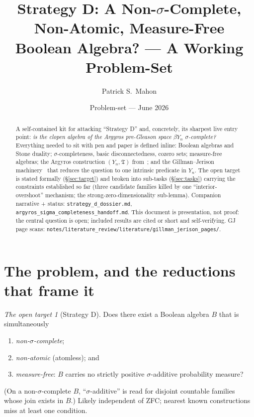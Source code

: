 \documentclass[11pt]{article}
\title{Strategy D: A Non-$\sigma$-Complete, Non-Atomic, Measure-Free\\
Boolean Algebra? --- A Working Problem-Set}
\author{Patrick S.\ Mahon}
\date{Problem-set --- June 2026}
\theoremstyle{definition}
\theoremstyle{remark}
\newtheorem*{target}{The open target}
\newcommand{\Y}{Y_n}
\newcommand{\T}{\mathfrak{T}}
\begin{document}
\maketitle

\begin{abstract}
\noindent A self-contained kit for attacking ``Strategy D'' and, concretely, its
sharpest live entry point: \emph{is the clopen algebra of the Argyros pre-Gleason
space $\beta\Y$ $\sigma$-complete?} Everything needed to sit with pen and paper is
defined inline: Boolean algebras and Stone duality; $\sigma$-completeness, basic
disconnectedness, cozero sets; measure-free algebras; the Argyros construction
$(\Y,\T)$ from~\cite{Argyros1983}; and the Gillman--Jerison
machinery~\cite{GJ} that reduces the question to one intrinsic predicate in $\Y$.
The open target is stated formally (\S\ref{sec:target}) and broken into sub-tasks
(\S\ref{sec:tasks}) carrying the constraints established so far (three candidate
families killed by one ``interior-overshoot'' mechanism; the strong-zero-dimensionality
sub-lemma). Companion narrative + status: \texttt{strategy\_d\_dossier.md},
\texttt{argyros\_sigma\_completeness\_handoff.md}. This document is presentation, not
proof: the central question is open; included results are cited or short and
self-verifying. GJ page scans:
\texttt{notes/literature\_review/literature/gillman\_jerison\_pages/}.
\end{abstract}

\tableofcontents

\section{The problem, and the reductions that frame it}\label{sec:problem}

\begin{target}[Strategy D]
Does there exist a Boolean algebra $B$ that is simultaneously
\begin{enumerate}[label=\textup{(\roman*)},nosep]
  \item \emph{non-$\sigma$-complete};
  \item \emph{non-atomic} (atomless); and
  \item \emph{measure-free}: $B$ carries no strictly positive $\sigma$-additive
    probability measure?
\end{enumerate}
(On a non-$\sigma$-complete $B$, ``$\sigma$-additive'' is read for disjoint countable
families whose join exists in $B$.) Likely independent of ZFC; nearest known
constructions miss at least one condition.
\end{target}
\end{document}
